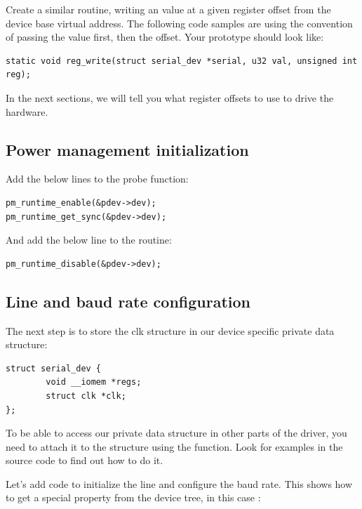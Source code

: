 Create a similar  routine, writing an 
value at a given register offset from
the device base virtual address. The following code samples are using
the  convention of passing the value first, then the
offset. Your prototype should look like:
\begin{verbatim}
static void reg_write(struct serial_dev *serial, u32 val, unsigned int reg);
\end{verbatim}

In the next sections, we will tell you what register offsets to use
to drive the hardware.

\subsection{Power management initialization}

Add the below lines to the probe function:

\begin{verbatim}
pm_runtime_enable(&pdev->dev);
pm_runtime_get_sync(&pdev->dev);
\end{verbatim}

And add the below line to the  routine:

\begin{verbatim}
pm_runtime_disable(&pdev->dev);
\end{verbatim}

\subsection{Line and baud rate configuration}

The next step is to store the clk structure in our device specific private data structure:

\begin{verbatim}
struct serial_dev {
        void __iomem *regs;
        struct clk *clk;
};
\end{verbatim}

To be able to access our private data structure in other parts of the
driver, you need to attach it to the  structure using the
 function. Look for examples in the
source code to find out how to do it.

Let's add code to initialize the line and configure the baud rate.
This shows how to get a special property from the device tree, in this case :


